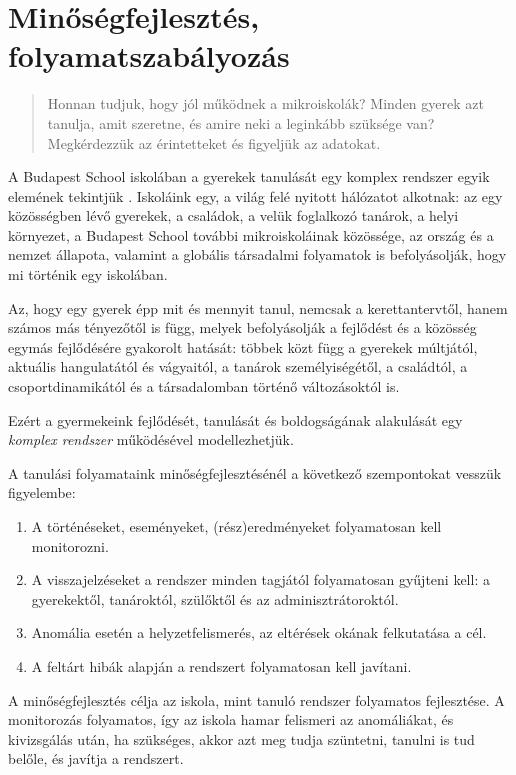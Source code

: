 \section{Minőségfejlesztés, folyamatszabályozás}
\label{sec:minosegbiztositas}
\begin{quote}
      Honnan tudjuk, hogy jól működnek a mikroiskolák? Minden gyerek azt
      tanulja,
      amit szeretne, és amire neki a leginkább szüksége van? Megkérdezzük az
      érintetteket és figyeljük az adatokat.
\end{quote}

A Budapest School iskolában a gyerekek tanulását egy komplex rendszer egyik
elemének tekintjük \citep{barabasi}. Iskoláink egy, a világ felé nyitott
hálózatot alkotnak: az egy közösségben lévő gyerekek, a családok, a velük
foglalkozó tanárok, a helyi környezet, a Budapest School további
mikroiskolái\-nak közössége, az ország és a nemzet állapota, valamint a globális
társadalmi folyamatok is befolyásolják, hogy mi történik egy iskolában.

Az, hogy egy gyerek épp mit és mennyit tanul, nemcsak a kerettantervtől,
hanem számos más tényezőtől is függ, melyek befolyásolják a fejlődést és a
közösség egymás fejlődésére gyakorolt hatását: többek közt függ a gyerekek
múltjától, aktuális hangulatától és vágyaitól, a tanárok személyiségétől, a
családtól, a csoportdinamikától és a társadalomban történő változásoktól
is.

Ezért a gyermekeink fejlődését, tanulását és boldogságának alakulását egy
\emph{komplex rendszer} működésével modellezhetjük.

A tanulási folyamataink minőségfejlesztésénél a következő szempontokat vesszük
figyelembe:
\begin{enumerate}
      \item  A történéseket, eseményeket, (rész)eredményeket folyamatosan kell
            monitorozni.
      \item  A visszajelzéseket a rendszer minden tagjától folyamatosan
            gyűjteni kell: a gyerekektől, tanároktól, szülőktől és az
            adminisztrátoroktól.
      \item Anomália esetén a helyzetfelismerés, az eltérések okának
            felkutatása a
            cél.
      \item A feltárt hibák alapján a rendszert folyamatosan kell javítani.
\end{enumerate}

A minőségfejlesztés célja az iskola, mint tanuló rendszer folyamatos
fejlesztése. A monitorozás folyamatos,
így az iskola hamar  felismeri az anomáliákat, és kivizsgálás után, ha szükséges,
akkor azt meg tudja szüntetni, tanulni is tud belőle, és
javítja a rendszert.

